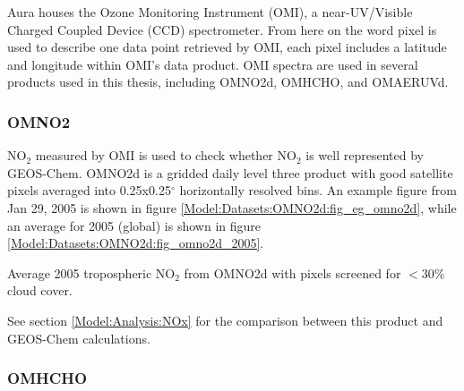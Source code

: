     Aura houses the Ozone Monitoring Instrument (OMI), a near-UV/Visible Charged Coupled Device (CCD) spectrometer.
    From here on the word pixel is used to describe one data point retrieved by OMI, each pixel includes a latitude and longitude within OMI's data product.
    OMI spectra are used in several products used in this thesis, including OMNO2d, OMHCHO, and OMAERUVd.
    
    
    \subsubsection{OMNO2}
      \label{Model:Datasets:OMNO2d}
      NO$_2$ measured by OMI is used to check whether NO$_2$ is well represented by GEOS-Chem. 
      OMNO2d is a gridded daily level three product with good satellite pixels averaged into 0.25x0.25$^{\circ}$ horizontally resolved bins.
      An example figure from Jan 29, 2005 is shown in figure \ref{Model:Datasets:OMNO2d:fig_eg_omno2d}, while an average for 2005 (global) is shown in figure \ref{Model:Datasets:OMNO2d:fig_omno2d_2005}.
      
      
        {Average 2005 tropospheric NO$_2$ from OMNO2d with pixels screened for $<30\%$ cloud cover.}
        {\label{Model:Datasets:OMNO2d:fig_omno2d_2005}}
      
      See section \ref{Model:Analysis:NOx} for the comparison between this product and GEOS-Chem calculations.
    
    \subsubsection{OMHCHO}
      \label{Model:Datasets:OMHCHO}
      
